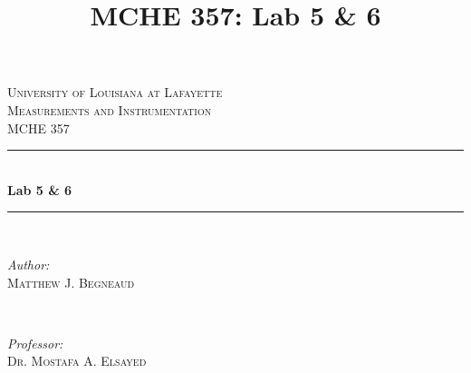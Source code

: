 \documentclass[12pt]{article}
\title{MCHE 357: Lab 5 & 6}
\begin{document}




\begin{titlepage}

\newcommand{\HRule}{\rule{\linewidth}{0.5mm}} %

\center %
 

\textsc{\LARGE University of Louisiana at Lafayette}\\[1.5cm] %
\textsc{\Large Measurements and Instrumentation}\\[0.5cm] %
\textsc{\large MCHE 357}\\[0.5cm] %


\HRule \\[0.4cm]
{ \huge \bfseries Lab 5 \& 6}\\[0.4cm] %
\HRule \\[1.5cm]
 

\begin{minipage}{0.4\textwidth}
\begin{flushleft} \large
\emph{Author:}\\
\textsc{Matthew J. Begneaud} \\%
\end{flushleft}
\end{minipage}
~
\begin{minipage}{0.4\textwidth}
\begin{flushright} \large
\emph{Professor:} \\
\textsc{Dr. Mostafa A. Elsayed} %
\end{flushright}
\end{minipage}\\[1.5cm]


\end{titlepage}
\end{document}

